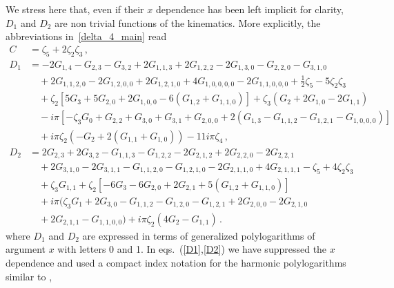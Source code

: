 We stress here that, even if their $x$ dependence has been left implicit for clarity, $D_1$ and $D_2$ are non trivial functions of the kinematics.
More explicitly, the abbreviations in~\eqref{delta_4_main} read
\begin{align}
\label{C}
C &=  \zeta_5 + 2 \zeta_2 \zeta_3\,,
\\[2ex]
D_1 &= -2 \textit{G}_{1,4}-\textit{G}_{2,3}-\textit{G}_{3,2}+2 \textit{G}_{1,1,3}+2 \textit{G}_{1,2,2}-2 \textit{G}_{1,3,0}-\textit{G}_{2,2,0}-\textit{G}_{3,1,0} \nonumber\\
&\quad +2 \textit{G}_{1,1,2,0}-2 \textit{G}_{1,2,0,0}+ 2 \textit{G}_{1,2,1,0}+4 \textit{G}_{1,0,0,0,0}-2 \textit{G}_{1,1,0,0,0}+\frac{1}{2}\zeta_5  - 5 \zeta_2 \zeta_3  \nonumber \\
 &\quad  + \zeta_2 [5 \textit{G}_{3}+5 \textit{G}_{2,0}+2 \textit{G}_{1,0,0}-6 (\textit{G}_{1,2}+\textit{G}_{1,1,0})] + \zeta_3 (\textit{G}_{2}+2 \textit{G}_{1,0}-2 \textit{G}_{1,1}) \nonumber\\
&\quad - i \pi  [-\zeta_3 \textit{G}_{0}+\textit{G}_{2,2}+\textit{G}_{3,0}+\textit{G}_{3,1}+ \textit{G}_{2,0,0}+2 (\textit{G}_{1,3}-\textit{G}_{1,1,2}-\textit{G}_{1,2,1}-\textit{G}_{1,0,0,0})]\nonumber\\
&\quad + i \pi \zeta_2 (-\textit{G}_{2}+2 (\textit{G}_{1,1}+\textit{G}_{1,0}))- 11 i\pi \zeta_4 \, ,\label{D1}\\[10pt]
D_2 &=  2 \textit{G}_{2,3}+2 \textit{G}_{3,2}-\textit{G}_{1,1,3}-\textit{G}_{1,2,2}-2 \textit{G}_{2,1,2}+2 \textit{G}_{2,2,0}-2 \textit{G}_{2,2,1} \nonumber\\
&\quad +2 \textit{G}_{3,1,0}-2 \textit{G}_{3,1,1}-\textit{G}_{1,1,2,0}- \textit{G}_{1,2,1,0}-2 \textit{G}_{2,1,1,0}+4 \textit{G}_{2,1,1,1}-\zeta_5 +4 \zeta_2 \zeta_3 \nonumber \\
&\quad + \zeta_3 \textit{G}_{1,1}+\zeta_2 [-6 \textit{G}_{3}-6 \textit{G}_{2,0}+2 \textit{G}_{2,1}+5 (\textit{G}_{1,2}+\textit{G}_{1,1,0})] \nonumber\\
&\quad + i \pi  (\zeta_3 \textit{G}_{1}+2 \textit{G}_{3,0}-\textit{G}_{1,1,2}-\textit{G}_{1,2,0}-\textit{G}_{1,2,1}+2 \textit{G}_{2,0,0}-2 \textit{G}_{2,1,0} \nonumber\\
&\quad +2 \textit{G}_{2,1,1}-\textit{G}_{1,1,0,0})+ i \pi \zeta_2  (4 \textit{G}_{2}-\textit{G}_{1,1}) \, .  \label{D2}
\end{align}
where $D_1$ and $D_2$ are expressed in terms of generalized polylogarithms of argument $x$ with letters 0 and 1.
In eqs.~(\ref{D1},\ref{D2}) we have suppressed the $x$ dependence and used a compact index notation for the harmonic polylogarithms similar to \cite{Remiddi:1999ew,Maitre:2005uu},
